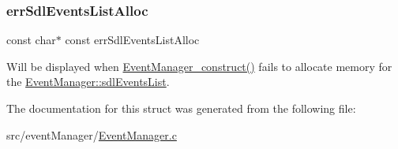 \subsubsection{\texorpdfstring{err\+Sdl\+Events\+List\+Alloc}{errSdlEventsListAlloc}}
{\footnotesize\ttfamily const char$\ast$ const err\+Sdl\+Events\+List\+Alloc}

Will be displayed when \hyperlink{_event_manager_8h_ab29e0486e59b74a74b8bd7832bbe573b}{Event\+Manager\+\_\+construct()} fails to allocate memory for the \hyperlink{struct_event_manager_ac563054d2cefbd8d20b1daf70eb35d78}{Event\+Manager\+::sdl\+Events\+List}. 

The documentation for this struct was generated from the following file\+:\begin{DoxyCompactItemize}
\item 
src/event\+Manager/\hyperlink{_event_manager_8c}{Event\+Manager.\+c}\end{DoxyCompactItemize}
